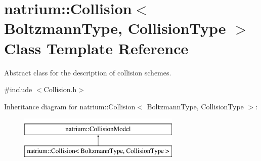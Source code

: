 \hypertarget{classnatrium_1_1Collision}{\section{natrium\-:\-:Collision$<$ Boltzmann\-Type, Collision\-Type $>$ Class Template Reference}
\label{classnatrium_1_1Collision}
}


Abstract class for the description of collision schemes.  




{\ttfamily \#include $<$Collision.\-h$>$}

Inheritance diagram for natrium\-:\-:Collision$<$ Boltzmann\-Type, Collision\-Type $>$\-:\begin{figure}[H]
\begin{center}
\leavevmode
\includegraphics[height=2.000000cm]{classnatrium_1_1Collision}
\end{center}
\end{figure}
